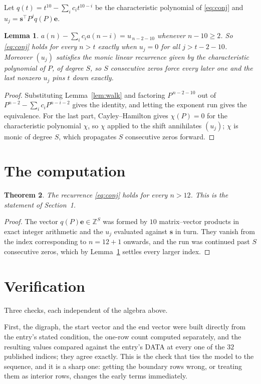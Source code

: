 \documentclass[11pt,a4paper]{article}
\theoremstyle{plain}
\newtheorem{theorem}{Theorem}
\newtheorem{lemma}[theorem]{Lemma}
\theoremstyle{definition}
\begin{document}
Let $q(t)=t^{10}-\sum_i c_i t^{10-i}$ be the characteristic polynomial of
\eqref{eq:conj} and $u_j=\mathbf{s}^{\!\top}P^{j}q(P)\mathbf{e}$.

\begin{lemma}\label{lem:crit}
$a(n)-\sum_i c_i a(n-i)=u_{\,n-2-10}$ whenever $n-10\ge2$. So \eqref{eq:conj}
holds for every $n>t$ exactly when $u_j=0$ for all $j>t-2-10$. Moreover $(u_j)$
satisfies the monic linear recurrence given by the characteristic polynomial of $P$, of
degree $S$, so $S$ consecutive zeros force every later one and the last nonzero $u_j$ pins
$t$ down exactly.
\end{lemma}

\begin{proof}
Substituting Lemma~\ref{lem:walk} and factoring $P^{\,n-2-10}$ out of
$P^{n-2}-\sum_i c_i P^{n-i-2}$ gives the identity, and letting the exponent run gives the
equivalence. For the last part, Cayley--Hamilton gives $\chi(P)=0$ for the characteristic
polynomial $\chi$, so $\chi$ applied to the shift annihilates $(u_j)$; $\chi$ is monic of
degree $S$, which propagates $S$ consecutive zeros forward.
\end{proof}

\section{The computation}

\begin{theorem}
The recurrence \eqref{eq:conj} holds for every $n>12$. This is the statement of
Section~1.
\end{theorem}

\begin{proof}
The vector $q(P)\mathbf{e}\in\mathbb{Z}^{S}$ was formed by $10$ matrix--vector
products in exact integer arithmetic and the $u_j$ evaluated against $\mathbf{s}$ in turn.
They vanish from the index corresponding to $n=12+1$ onwards, and the run was continued
past $S$ consecutive zeros, which by Lemma~\ref{lem:crit} settles every larger index.
\end{proof}

\section{Verification}

Three checks, each independent of the algebra above.

First, the digraph, the start vector and the end vector were built directly from the
entry's stated condition, the one-row count computed separately, and the resulting values
compared against the entry's DATA at every one of the $32$ published indices; they
agree exactly. This is the check that ties the model to the sequence, and it is a sharp one:
getting the boundary rows wrong, or treating them as interior rows, changes the early terms
immediately.
\end{document}

